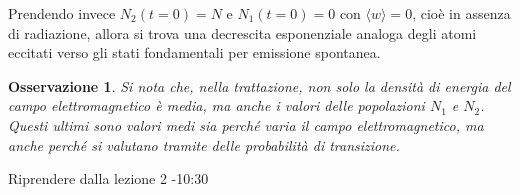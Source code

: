 \documentclass[11pt, a4paper]{scrartcl}
\theoremstyle{style}
\newtheorem{osservazione}{Osservazione}[section]
\newenvironment{boxenv}[1][]{
    \begin{eqbox}[#1]
    }{
   \end{eqbox}
}
\numberwithin{equation}{subsection}
\begin{document}
Prendendo invece $N_2(t=0) = N$ e $N_1(t=0) = 0$ con $\langle w \rangle=0$, cio\`e in assenza di radiazione, allora si trova una decrescita esponenziale analoga degli atomi eccitati verso gli stati fondamentali per emissione spontanea.
\begin{osservazione}
Si nota che, nella trattazione, non solo la densit\`a di energia del campo elettromagnetico \`e media, ma anche i valori delle popolazioni $N_1$ e $N_2$.
Questi ultimi sono valori medi sia perch\'e varia il campo elettromagnetico, ma anche perch\'e si valutano tramite delle \textit{probabilit\`a di transizione}.
\end{osservazione}
\begin{boxenv}[]
\centering Riprendere dalla lezione 2 -10:30
\end{boxenv}
\end{document}
